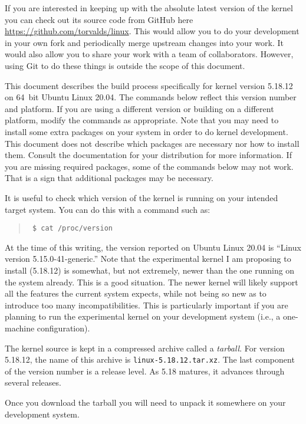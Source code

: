 \documentclass{article}
\newcommand{\filename}[1]{\texttt{#1}}
\newcommand{\newterm}[1]{\textit{#1}}
\newenvironment{commands}
  {\begin{quote} \tt}
  {\end{quote}}
\begin{document}
If you are interested in keeping up with the absolute latest version of the kernel you can check
out its source code from GitHub here \url{https://github.com/torvalds/linux}. This would allow
you to do your development in your own fork and periodically merge upstream changes into your
work. It would also allow you to share your work with a team of collaborators. However, using
Git to do these things is outside the scope of this document.

This document describes the build process specifically for kernel version 5.18.12 on 64~bit
Ubuntu Linux 20.04. The commands below reflect this version number and platform. If you are
using a different version or building on a different platform, modify the commands as
appropriate. Note that you may need to install some extra packages on your system in order to do
kernel development. This document does not describe which packages are necessary nor how to
install them. Consult the documentation for your distribution for more information. If you are
missing required packages, some of the commands below may not work. That is a sign that
additional packages may be necessary.

It is useful to check which version of the kernel is running on your intended target system. You
can do this with a command such as:

\begin{commands}
  \$ cat /proc/version
\end{commands}

At the time of this writing, the version reported on Ubuntu Linux 20.04 is ``Linux version
5.15.0-41-generic.'' Note that the experimental kernel I am proposing to install (5.18.12) is
somewhat, but not extremely, newer than the one running on the system already. This is a good
situation. The newer kernel will likely support all the features the current system expects,
while not being so new as to introduce too many incompatibilities. This is particularly important
if you are planning to run the experimental kernel on your development system (i.e., a
one-machine configuration).

The kernel source is kept in a compressed archive called a \newterm{tarball}. For version
5.18.12, the name of this archive is \filename{linux-5.18.12.tar.xz}. The last component of the
version number is a release level. As 5.18 matures, it advances through several releases.

Once you download the tarball you will need to unpack it somewhere on your development system.
\end{document}
